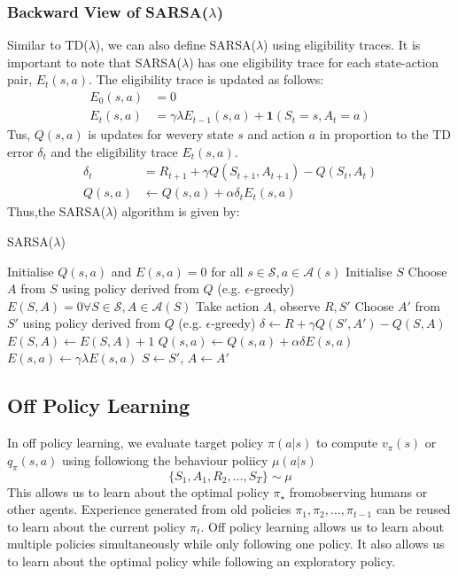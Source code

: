 \subsubsection*{Backward View of SARSA(\(\lambda\))}
Similar to TD(\(\lambda\)), we can also define SARSA(\(\lambda\)) using eligibility traces.
It is important to note that SARSA(\(\lambda \)) has one eligibility trace for each
state-action pair, \(E_t(s,a)\). The eligibility trace is updated as follows:
\[
  \begin{aligned}
    E_0(s,a) &= 0 \\
    E_t(s,a) &= \gamma \lambda E_{t-1}(s,a) + \bm{1}(S_t = s, A_t = a)
  \end{aligned}
\]
Tus, \(Q(s,a)\) is updates for wevery state \(s\) and action \(a\) in proportion to the TD
error \(\delta _t\) and the eligibility trace \(E_t(s,a)\).
\[
  \begin{aligned}
    \delta _t &= R_{t+1} + \gamma Q(S_{t+1}, A_{t+1}) - Q(S_t, A_t) \\
    Q(s,a) &\leftarrow Q(s,a) + \alpha \delta _t E_t(s,a)
  \end{aligned}
\]
Thus,the SARSA(\(\lambda\)) algorithm is given by:
\begin{algorithm}[H]
  \caption{SARSA(\(\lambda\))}
  \label{alg:sarsa-lambda}
  \begin{algorithmic}[1]
    \State Initialise \(Q(s,a)\) and \(E(s,a) = 0\) for all \(s \in \mathcal{S}, a \in
    \mathcal{A}(s)\)
      \State Initialise \(S\)
      \State Choose \(A\) from \(S\) using policy derived from \(Q\) (e.g.
      \(\epsilon\)-greedy)
      \State \(E(S,A) = 0 \forall S \in \mathcal{S}, A \in \mathcal{A}(S)\)
        \State Take action \(A\), observe \(R, S'\)
        \State Choose \(A'\) from \(S'\) using policy derived from \(Q\) (e.g.
        \(\epsilon\)-greedy)
        \State \(\delta \leftarrow R + \gamma Q(S', A') - Q(S,A)\)
        \State \(E(S,A) \leftarrow E(S,A) + 1\)
          \State \(Q(s,a) \leftarrow Q(s,a) + \alpha \delta E(s,a)\)
          \State \(E(s,a) \leftarrow \gamma \lambda E(s,a)\)
        \EndFor
        \State \(S \leftarrow S'\), \(A \leftarrow A'\)
      \EndFor
    \EndFor
  \end{algorithmic}
\end{algorithm}

\subsection{Off Policy Learning}
In off policy learning, we evaluate target policy \(\pi(a|s)\) to compute \(v_\pi(s)\) or \(q_\pi
(s,a)\) using followiong the behaviour poliicy \(\mu(a|s)\)
\[
  \{  S_1, A_1, R_2, \dots, S_T \} \sim \mu
\]
This allows us to learn about the optimal policy \(\pi_\star\) fromobserving humans 
or other agents. Experience generated from old policies \(\pi _1, \pi _2, \dots, \pi _{t-1}\)
can be reused to learn about the current policy \(\pi _t\). Off policy learning allows us to
learn about multiple policies simultaneously while only following one policy. It also allows
us to learn about the optimal policy while following an exploratory policy. 

